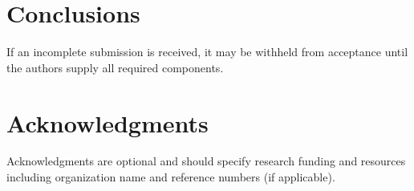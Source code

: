 \documentclass[10pt, a4paper, twocolumn]{article}
\begin{document}
\section*{Conclusions}

If an incomplete submission is received, it may be withheld from acceptance until the authors supply all required components.

\section*{Acknowledgments}
Acknowledgments are optional and should specify research funding and resources including organization name and reference numbers (if applicable).

\printbibliography %
\end{document}
